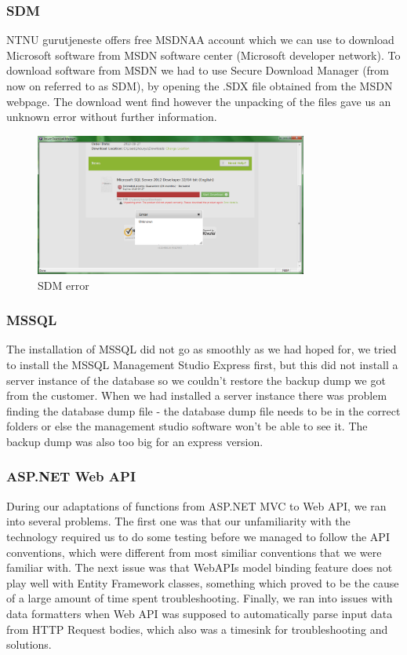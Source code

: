 \subsubsection{SDM}
NTNU gurutjeneste offers free MSDNAA account which we can use to download Microsoft software from MSDN software center (Microsoft developer network). To download software from MSDN we had to use Secure Download Manager (from now on referred to as SDM), by opening the .SDX file obtained from the MSDN webpage. The download went find however the unpacking of the files gave us an unknown error without further information.
\begin{figure}[H]
\centering
\includegraphics[width=0.8\textwidth]{images/issue00.png}
\caption{SDM error}
\label{fig:SDM_error}
\end{figure}

\subsubsection{MSSQL}
The installation of MSSQL did not go as smoothly as we had hoped for, we tried to install the MSSQL Management Studio Express first, but this did not install a server instance of the database so we couldn't restore the backup dump we got from the customer. When we had installed a server instance there was problem finding the database dump file - the database dump file needs to be in the correct folders or else the management studio software won't be able to see it. The backup dump was also too big for an express version.

\subsubsection{ASP.NET Web API}
\label{subsubsec:webapiissues}
During our adaptations of functions from ASP.NET MVC to Web API, we ran into several problems. The first one was that our unfamiliarity with the technology required us to do some testing before we managed to follow the API conventions, which were different from most similiar conventions that we were familiar with.
The next issue was that WebAPIs model binding feature does not play well with Entity Framework classes, something which proved to be the cause of a large amount of time spent troubleshooting.
Finally, we ran into issues with data formatters when Web API was supposed to automatically parse input data from HTTP Request bodies, which also was a timesink for troubleshooting and solutions.

